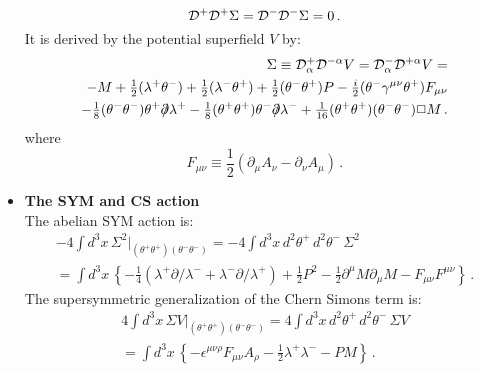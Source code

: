 \documentclass[a4paper,12pt]{article}
\newcommand{\ft}[2]{{\textstyle\frac{#1}{#2}}}
\begin{document}
\begin{itemize}
\begin{equation}
{\cal D}^+{\cal D}^+\Sigma={\cal D}^-{\cal D}^-\Sigma=0\,.
\end{equation}
It is derived by the potential superfield $V$ by:
\begin{eqnarray}
\Sigma\equiv{\cal D}^+_{\alpha}{\cal D}^{-\alpha}V=
{\cal D}^-_{\alpha}{\cal D}^{+\alpha}V=\nonumber\\
-M+\ft{1}{2}(\lambda^+\theta^-)+\ft{1}{2}(\lambda^-\theta^+)
+\ft{1}{2}(\theta^-\theta^+)P
-\ft{i}{2}(\theta^-\gamma^{\mu\nu}\theta^+)F_{\mu\nu}\nonumber\\
-\ft{1}{8}(\theta^-\theta^-)\theta^+\partial\!\!\!/\lambda^+
-\ft{1}{8}(\theta^+\theta^+)\theta^-\partial\!\!\!/\lambda^-
+\ft{1}{16}(\theta^+\theta^+)(\theta^-\theta^-)\Box M\,.
\end{eqnarray}
where
\begin{equation}
F_{\mu\nu}\equiv\ft{1}{2}\left(\partial_\mu A_\nu-\partial_\nu A_\mu\right)\,.
\end{equation}
\item {\bf The SYM and CS action}\\
The abelian SYM action is:
\begin{eqnarray}
-4\int d^3x\,\Sigma^2|_{(\theta^+\theta^+)(\theta^-\theta^-)}=
-4\int d^3x\,d^2\theta^+\,d^2\theta^-\,\Sigma^2\nonumber\\
=\int d^3x\,\left\{
-\ft{1}{4}\left(\lambda^+\partial\!\!\!/\lambda^-
+\lambda^-\partial\!\!\!/\lambda^+\right)
+\ft{1}{2}P^2-\ft{1}{2}\partial^\mu M\partial_\mu M
-F_{\mu\nu}F^{\mu\nu}\right\}\,.
\end{eqnarray}
The supersymmetric generalization of the Chern Simons term is:
\begin{eqnarray}
4\int d^3x\,\Sigma V|_{(\theta^+\theta^+)(\theta^-\theta^-)}=
4\int d^3x\,d^2\theta^+\,d^2\theta^-\,\Sigma V\nonumber\\
=\int d^3x\,\left\{-\epsilon^{\mu\nu\rho}F_{\mu\nu}A_\rho
-\ft{1}{2}\lambda^+\lambda^--PM\right\}\,.
\end{eqnarray}
\end{itemize}
\end{document}
